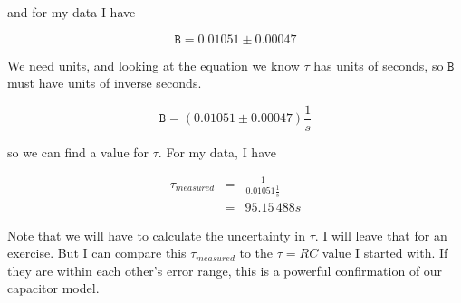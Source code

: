 \noindent and for my data I have 

\begin{equation*}
	\mathtt{B}=0.01051\pm 0.00047
\end{equation*}
\newline

We need units, and looking at the equation we know $\tau $ has units of seconds, so $\mathtt{B}$ must have units of inverse seconds.

\begin{equation*}
	\mathtt{B}=\left( 0.01051\pm 0.00047\right) \frac{1}{\unit{s}}
\end{equation*}

\noindent so we can find a value for $\tau .$ For my data, I have 

\begin{eqnarray*}
	\tau _{measured} &=&\frac{1}{ 0.01051\frac{1}{\unit{s}}} \\
	&=&95.15\,\allowbreak 488\unit{s}
\end{eqnarray*}

Note that we will have to calculate the uncertainty in $\tau .$ I will leave that for an exercise. But I can compare this $\tau _{measured}$ to the $\tau=RC$ value I started with. If they are within each other's error range, this is a powerful confirmation of our capacitor model.


